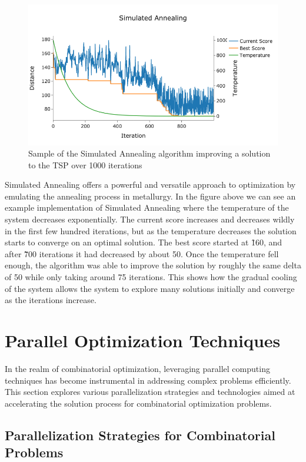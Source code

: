 \documentclass[11pt]{report}
\begin{document}
        \begin{figure}[h]
            \centering
            \includegraphics[width=1\textwidth,keepaspectratio]{Images/SA.png}
            \caption{Sample of the Simulated Annealing algorithm improving a solution to the TSP over 1000 iterations}
            \label{fig:bandb}
        \end{figure}
        \newpage
        Simulated Annealing offers a powerful and versatile approach to optimization by emulating the annealing process in metallurgy. In the figure above we can see an example implementation of Simulated Annealing where the temperature of the system decreases exponentially. The current score increases and decreases wildly in the first few hundred iterations, but as the temperature decreases the solution starts to converge on an optimal solution. The best score started at \~160, and after \~700 iterations it had decreased by about 50. Once the temperature fell enough, the algorithm was able to improve the solution by roughly the same delta of 50 while only taking around 75 iterations. This shows how the gradual cooling of the system allows the system to explore many solutions initially and converge as the iterations increase.
        

    \section{Parallel Optimization Techniques}
    In the realm of combinatorial optimization, leveraging parallel computing techniques has become instrumental in addressing complex problems efficiently. This section explores various parallelization strategies and technologies aimed at accelerating the solution process for combinatorial optimization problems.
    
        \subsection{Parallelization Strategies for Combinatorial Problems}
\end{document}
